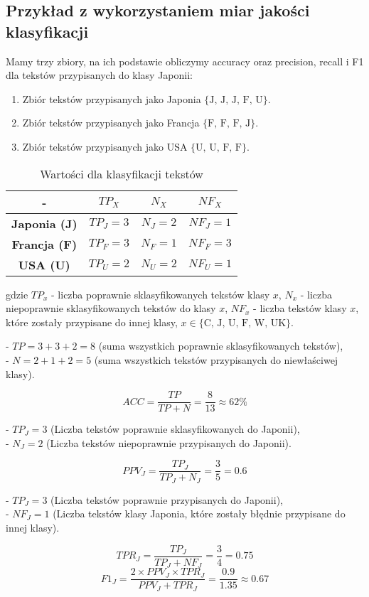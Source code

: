 \documentclass{article}
\begin{document}
\subsection{Przykład z wykorzystaniem miar jakości klasyfikacji}
Mamy trzy zbiory, na ich podstawie obliczymy accuracy oraz precision, recall i F1 dla tekstów przypisanych do klasy Japonii: 
\begin{enumerate}
    \item Zbiór tekstów przypisanych jako Japonia \( \{ \text{J, J, J, F, U} \} \).
    \item Zbiór tekstów przypisanych jako Francja \( \{ \text{F, F, F, J} \} \).
    \item Zbiór tekstów przypisanych jako USA \( \{ \text{U, U, F, F} \} \).
\end{enumerate}

\begin{table}[h!]
    \centering
    \begin{tabular}{|c|c|c|c|}
        \hline
        - & \textbf{\(TP_X\)} & \textbf{\(N_X\)} & \textbf{\(NF_X\)} \\
        \hline
        \textbf{Japonia (J)}  & \( TP_J = 3 \) & \( N_J = 2 \) & \( NF_J = 1 \) \\
        \hline
        \textbf{Francja (F)}  & \( TP_F = 3 \) & \( N_F = 1 \) & \( NF_F = 3 \) \\
        \hline
        \textbf{USA (U)}      & \( TP_U = 2 \) & \( N_U = 2 \) & \( NF_U = 1 \) \\
        \hline
    \end{tabular}
    \caption{Wartości dla klasyfikacji tekstów}
\end{table}



gdzie \(TP_x\) - liczba poprawnie sklasyfikowanych tekstów klasy \(x\), \(N_x\) - liczba niepoprawnie sklasyfikowanych  tekstów do klasy \(x\), \(NF_x\) - liczba tekstów klasy \(x\), które zostały przypisane do innej klasy, \(x \in \{ \text{C, J, U, F, W, UK} \}\).

\begin{flushleft}
- \(TP = 3 + 3 + 2 = 8\) (suma wszystkich poprawnie sklasyfikowanych tekstów),\\
- \(N = 2 + 1 + 2 = 5\) (suma wszystkich tekstów przypisanych do niewłaściwej klasy).

\[
    ACC = \frac{TP}{TP + N} = \frac{8}{13} \approx 62\%
\]

- \(TP_J = 3\) (Liczba tekstów poprawnie sklasyfikowanych do Japonii),\\
- \(N_J = 2\) (Liczba tekstów niepoprawnie przypisanych do Japonii).

\[
    PPV_J = \frac{TP_J}{TP_J + N_J} =\frac{3}{5} = 0.6
\]

- \(TP_J = 3\) (Liczba tekstów poprawnie przypisanych do Japonii),\\
- \(NF_J = 1\) (Liczba tekstów klasy Japonia, które zostały błędnie przypisane do innej klasy).

\[
    TPR_J = \frac{TP_J}{TP_J + NF_J} = \frac{3}{4} = 0.75
\]
\[
    F1_J = \frac{2 \times PPV_J \times TPR_J}{PPV_J + TPR_J} = \frac{0.9}{1.35} \approx 0.67
\]

\end{flushleft}
\end{document}
